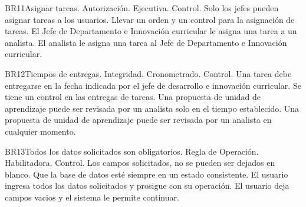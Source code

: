 \begin{BussinesRule}{BR11}{Asignar tareas.}
    \BRitem[Tipo:] Autorización.
    \BRitem[Clase:] Ejecutiva.
    \BRitem[Nivel:] Control.
    \BRitem[Descripción:] Solo los jefes pueden asignar tareas a los usuarios.
    \BRitem[Sentencia:]
    \BRitem[Motivación:] Llevar un orden y un control para la asignación de tareas.
     El Jefe de Departamento e Innovación curricular le asigna una tarea a un analista.
     El analista le asigna una tarea al Jefe de Departamento e Innovación curricular.
\end{BussinesRule}

\begin{BussinesRule}{BR12}{Tiempos de entregas.}
    \BRitem[Tipo:] Integridad.
    \BRitem[Clase:] Cronometrado.
    \BRitem[Nivel:] Control.
    \BRitem[Descripción:] Una tarea debe entregarse en la fecha indicada por el jefe de desarrollo e innovación curricular.
    \BRitem[Motivación:] Se tiene un control en las entregas de tareas.
     Una propuesta de unidad de aprendizaje puede ser revisada por un analista solo en el tiempo establecido.
     Una propuesta de unidad de aprendizaje puede ser revisada por un analista en cualquier momento.
\end{BussinesRule}

\begin{BussinesRule}{BR13}{Todos los datos solicitados son obligatorios.}
    \BRitem[Tipo:] Regla de Operación.
    \BRitem[Clase:] Habilitadora.
    \BRitem[Nivel:] Control.
    \BRitem[Descripción:] Los campos solicitados, no se pueden ser dejados en blanco.
    \BRitem[Sentencia:]
    \BRitem[Motivación: ]Que la base de datos esté siempre en un estado consistente.
     El usuario ingresa todos los datos solicitados y prosigue con su operación.
    El usuario deja campos vacios y el sistema le permite continuar.
\end{BussinesRule}

